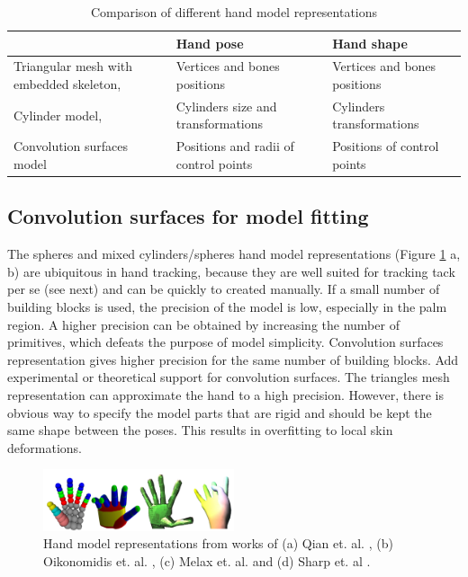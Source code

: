 \begin{table}[!h] 
	\centering
	\begin{tabular}{|p{2.5cm}|p{2.5cm}|p{2.5cm}|}
	\hline
 	& Hand pose  & Hand shape  \\
	\hline
	Triangular mesh with embedded skeleton, \cite{taylor2014user} & Vertices and bones positions & Vertices and bones positions	 \\
	\hline
	Cylinder model, \cite{tagliasacchi2015robust} & Cylinders size and transformations & Cylinders transformations	 \\
	\hline
	Convolution surfaces model & Positions and radii of control points & Positions of control points \\
	\hline
	\end{tabular}
	\vspace{1em}
	\caption{Comparison of different hand model representations}
	\label{table:representation_dependent_components}
\end{table}


\subsection{Convolution surfaces for model fitting}
The spheres and mixed cylinders/spheres hand model representations (Figure \ref{fig:hand_model_representations} a, b) are ubiquitous in hand tracking, because they are well suited for tracking tack per se (see next) and can be quickly to created manually. If a small number of  building blocks is used, the precision of the model is low, especially in the palm region. A higher precision can be obtained by increasing the number of primitives, which defeats the purpose of model simplicity. Convolution surfaces representation gives higher precision for the same number of building blocks. \textcolor{mygray}{Add experimental or theoretical support for convolution surfaces.}
The triangles mesh representation can approximate the hand to a high precision. However, there is obvious way to specify the model parts that are rigid and should be kept the same shape between the poses. This results in overfitting to local skin deformations. 

\begin{figure}[h!] 
	\centering
	\hspace{-2em}
	\includegraphics[width=0.5\textwidth]{figures/hand_model_representations}
	\caption{Hand model representations from works of (a) Qian et. al. \cite{qian2014realtime}, (b)  Oikonomidis et. al. \cite{oikonomidis2014evolutionary}, (c) Melax et. al. \cite{melax2013dynamics} and (d) Sharp et. al \cite{sharp2015accurate}.}
	\label{fig:hand_model_representations}
\end{figure}

